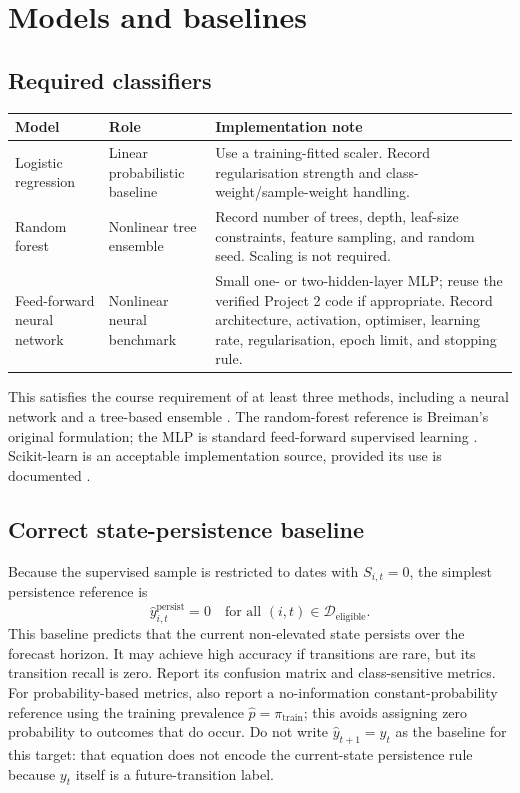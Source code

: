 \documentclass[11pt,a4paper]{article}
\begin{document}
\section{Models and baselines}
\label{sec:models}

\subsection{Required classifiers}

\begin{center}
\begin{tabularx}{\textwidth}{p{3.3cm}p{4.0cm}X}
\toprule
\textbf{Model} & \textbf{Role} & \textbf{Implementation note}\\
\midrule
Logistic regression & Linear probabilistic baseline & Use a training-fitted scaler. Record regularisation strength and class-weight/sample-weight handling.\\
Random forest & Nonlinear tree ensemble & Record number of trees, depth, leaf-size constraints, feature sampling, and random seed. Scaling is not required.\\
Feed-forward neural network & Nonlinear neural benchmark & Small one- or two-hidden-layer MLP; reuse the verified Project 2 code if appropriate. Record architecture, activation, optimiser, learning rate, regularisation, epoch limit, and stopping rule.\\
\bottomrule
\end{tabularx}
\end{center}

This satisfies the course requirement of at least three methods, including a neural network and a tree-based ensemble \cite{UiOProject3}. The random-forest reference is Breiman's original formulation; the MLP is standard feed-forward supervised learning \cite{Breiman2001,Goodfellow2016}. Scikit-learn is an acceptable implementation source, provided its use is documented \cite{Pedregosa2011}.

\subsection{Correct state-persistence baseline}

Because the supervised sample is restricted to dates with $S_{i,t}=0$, the simplest persistence reference is
\begin{equation}
  \widehat{y}_{i,t}^{\mathrm{persist}}=0
  \quad\text{for all }(i,t)\in\mathcal{D}_{\mathrm{eligible}}.
\end{equation}
This baseline predicts that the current non-elevated state persists over the forecast horizon. It may achieve high accuracy if transitions are rare, but its transition recall is zero. Report its confusion matrix and class-sensitive metrics. For probability-based metrics, also report a no-information constant-probability reference using the training prevalence $\hat p=\pi_{\mathrm{train}}$; this avoids assigning zero probability to outcomes that do occur. Do not write $\widehat y_{t+1}=y_t$ as the baseline for this target: that equation does not encode the current-state persistence rule because $y_t$ itself is a future-transition label.
\end{document}
